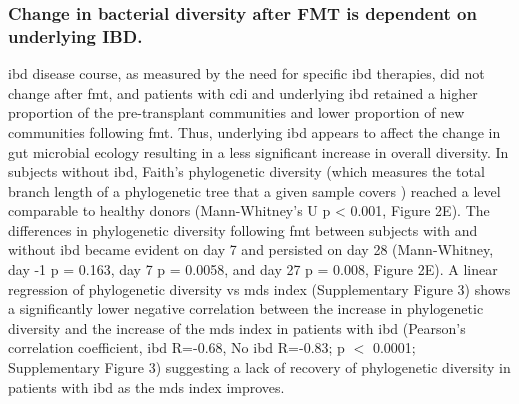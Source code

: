\subsubsection{Change in bacterial diversity after FMT is dependent on underlying IBD.}

\gls{ibd} disease course, as measured by the need for specific \gls{ibd} therapies, did not change after \gls{fmt}, and patients with \gls{cdi} and underlying \gls{ibd} retained a higher proportion of the pre-transplant communities and lower proportion of new communities following \gls{fmt}.  Thus, underlying \gls{ibd} appears to affect the change in gut microbial ecology resulting in a less significant increase in overall diversity. In subjects without \gls{ibd}, Faith's phylogenetic diversity (which measures the total branch length of a phylogenetic tree that a given sample covers \cite{RN1490}) reached a level comparable to healthy donors (Mann-Whitney's U p < 0.001, Figure 2E). The differences in phylogenetic diversity following \gls{fmt} between subjects with and without \gls{ibd} became evident on day 7 and persisted on day 28 (Mann-Whitney, day -1 p = 0.163, day 7 p = 0.0058, and day 27 p = 0.008, Figure 2E). A linear regression of phylogenetic diversity vs \glspl{md} index (Supplementary Figure 3) shows a significantly lower negative correlation between the increase in phylogenetic diversity and the increase of the \glspl{md} index in patients with \gls{ibd} (Pearson's correlation coefficient, \gls{ibd} R=-0.68, No \gls{ibd} R=-0.83; p $<$ 0.0001; Supplementary Figure 3) suggesting a lack of recovery of phylogenetic diversity in patients with \gls{ibd} as the \glspl{md} index improves.

